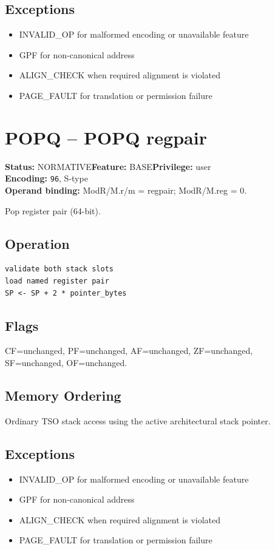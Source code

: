 \documentclass[10pt]{article}
\begin{document}
\subsection*{Exceptions}
\begin{itemize}
\item INVALID\_OP for malformed encoding or unavailable feature
\item GPF for non-canonical address
\item ALIGN\_CHECK when required alignment is violated
\item PAGE\_FAULT for translation or permission failure
\end{itemize}
\clearpage

\section{POPQ -- POPQ regpair}
\textbf{Status:} NORMATIVE\quad \textbf{Feature:} BASE\quad \textbf{Privilege:} user\\
\textbf{Encoding:} \texttt{96}, S-type\\
\textbf{Operand binding:} ModR/M.r/m = regpair; ModR/M.reg = 0.

Pop register pair (64-bit).

\subsection*{Operation}
\begin{lstlisting}
validate both stack slots
load named register pair
SP <- SP + 2 * pointer_bytes
\end{lstlisting}
\subsection*{Flags}
CF=unchanged, PF=unchanged, AF=unchanged, ZF=unchanged, SF=unchanged, OF=unchanged.
\subsection*{Memory Ordering}
Ordinary TSO stack access using the active architectural stack pointer.
\subsection*{Exceptions}
\begin{itemize}
\item INVALID\_OP for malformed encoding or unavailable feature
\item GPF for non-canonical address
\item ALIGN\_CHECK when required alignment is violated
\item PAGE\_FAULT for translation or permission failure
\end{itemize}
\clearpage
\end{document}
